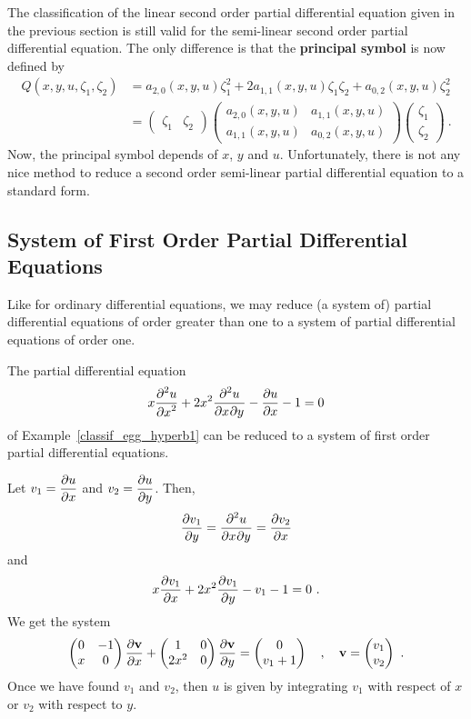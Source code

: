 The classification of the linear second order partial differential
equation given in the previous section is still valid for the
semi-linear second order partial differential equation.  The only
difference is that the {\bfseries principal symbol}
is now defined by
\begin{align*}
Q(x,y,u,\zeta_1,\zeta_2) &= a_{2,0}(x,y,u) \zeta_1^2 +
2a_{1,1}(x,y,u)\zeta_1\zeta_2 + a_{0,2}(x,y,u) \zeta_2^2 \\
&=
\begin{pmatrix}
\zeta_1 & \zeta_2
\end{pmatrix}
\begin{pmatrix}
a_{2,0}(x,y,u) & a_{1,1}(x,y,u) \\
a_{1,1}(x,y,u) & a_{0,2}(x,y,u)  
\end{pmatrix}
\begin{pmatrix}
\zeta_1 \\ \zeta_2
\end{pmatrix} \ .
\end{align*}
Now, the principal symbol depends of $x$, $y$ and $u$.  Unfortunately,
there is not any nice method to reduce a second order semi-linear
partial differential equation to a standard form.

\subsection{System of First Order Partial Differential Equations}

Like for ordinary differential equations, we may reduce (a system of)
partial differential equations of order greater
than one to a system of partial differential equations of order one.

\begin{egg}
The partial differential equation
\[
x \pdydxn{u}{x}{2} + 2 x^2 \pdydxnm{u}{x}{y}{2}{}{} - \pdydx{u}{x} - 1
= 0
\]
of Example~\ref{classif_egg_hyperb1} can be reduced to a system of
first order partial differential equations.

Let $\displaystyle v_1 = \pdydx{u}{x}$ and
$\displaystyle v_2 = \pdydx{u}{y}$.  Then,
\[
\pdydx{v_1}{y} = \pdydxnm{u}{x}{y}{2}{}{} = \pdydx{v_2}{x}
\]
and
\[
x \pdydx{v_1}{x} + 2 x^2 \pdydx{v_1}{y} - v_1 - 1 = 0 \  .
\]
We get the system
\[
\begin{pmatrix}
0 & -1 \\
x & 0
\end{pmatrix}
\pdydx{\VEC{v}}{x}
+
\begin{pmatrix}
1 & 0 \\
2x^2 & 0
\end{pmatrix}
\pdydx{\VEC{v}}{y}
=
\begin{pmatrix}
0 \\ v_1+1
\end{pmatrix} \quad , \quad
\VEC{v} =
\begin{pmatrix}
v_1 \\ v_2
\end{pmatrix} \ .
\]
Once we have found $v_1$ and $v_2$, then $u$ is
given by integrating $v_1$ with respect of $x$ or $v_2$ with
respect to $y$.
\end{egg}

